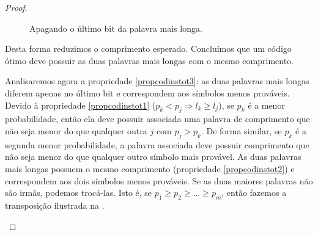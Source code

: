 \begin{proof}
\begin{figure}[h!]
 \caption{Apagando o último bit da palavra mais longa.}\label{fig:lemmahuffman}
 \end{figure}
Desta forma reduzimos o comprimento esperado. Concluímos que um código ótimo deve possuir as duas
palavras mais longas com o mesmo comprimento.

Analisaremos agora a propriedade \ref{propcodinstot3}: as duas palavras mais longas diferem apenas no último bit e correspondem aos símbolos menos prováveis.
Devido à propriedade \ref{propcodinstot1} ($p_k < p_j \Rightarrow l_k \geq l_j$), se $p_k$ é a menor probabilidade, então ela deve
possuir associada uma palavra de comprimento que não seja menor do que qualquer outra $j$ com $p_j > p_k$.
De forma similar, se $p_k$ é a segunda menor probabilidade, a palavra associada deve possuir comprimento que não seja
menor do que qualquer outro símbolo mais provável.
As duas palavras mais longas possuem o mesmo comprimento (propriedade \ref{propcodinstot2}) e
correspondem aos dois símbolos menos prováveis.
Se as duas maiores palavras não são irmãs, podemos trocá-las. Isto é, se $p_1 \geq p_2 \geq \ldots \geq p_m$, então
fazemos a transposição ilustrada na .

\begin{figure}[h!]
\centering
\end{figure}
\end{proof}
